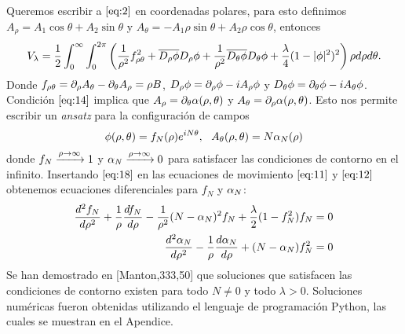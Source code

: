 Queremos escribir a $\eqref{eq:2}$ en coordenadas polares, para esto definimos $A_\rho = A_1\cos\theta+A_2\sin\theta$ y $A_\theta=-A_1\rho\sin\theta+A_2\rho\cos\theta$, entonces
\begin{align}
    V_\lambda = \frac{1}{2}\int_0^\infty\int_0^{2\pi}\left(\frac{1}{\rho^2}f_{\rho\theta}^2+\overline{D_\rho\phi}D_\rho\phi+\frac{1}{\rho^2}\overline{D_\theta\phi}D_\theta\phi+\frac{\lambda}{4}(1-|\phi|^2)^2\right)\rho d\rho d\theta .\label{eq:17}  
\end{align}
Donde $f_{\rho\theta}=\partial_\rho A_\theta-\partial_\theta A_\rho=\rho B$, $D_\rho\phi=\partial_\rho\phi-iA_\rho\phi$ y $D_\theta\phi=\partial_\theta \phi-iA_\theta\phi$. Condición $\eqref{eq:14}$ implica que $A_\rho=\partial_\theta\alpha(\rho,\theta)$ y $A_\theta=\partial_\rho \alpha(\rho,\theta)$. Esto nos permite escribir un \emph{ansatz} para la configuración de campos
\begin{align}
    \phi(\rho,\theta) = f_N(\rho)e^{iN\theta},\ \ A_\theta(\rho,\theta) = N\alpha_N(\rho) \label{eq:18} 
\end{align}
donde $f_N\xrightarrow{\rho\rightarrow\infty} 1$ y $\alpha_N\xrightarrow{\rho\rightarrow\infty} 0$ para satisfacer las condiciones de contorno en el infinito. Insertando $\eqref{eq:18}$ en las ecuaciones de movimiento $\eqref{eq:11}$ y $\eqref{eq:12}$ obtenemos ecuaciones diferenciales para $f_N$ y $\alpha_N$:
\begin{align}
    \frac{d^2f_N}{d\rho^2}+\frac{1}{\rho}\frac{df_N}{d\rho}-\frac{1}{\rho^2}(N-\alpha_N)^2 f_N+\frac{\lambda}{2}(1-f_N^2)f_N &=0\\
    \frac{d^2\alpha_N}{d\rho^2}-\frac{1}{\rho}\frac{d\alpha_N}{d\rho}+(N-\alpha_N)f_N^2 &= 0
\end{align}
Se han demostrado en [Manton,333,50] que soluciones que satisfacen las condiciones de contorno existen para todo $N\neq 0$ y todo $\lambda>0$. Soluciones numéricas fueron obtenidas utilizando el lenguaje de programación Python, las cuales se muestran en el Apendice.


